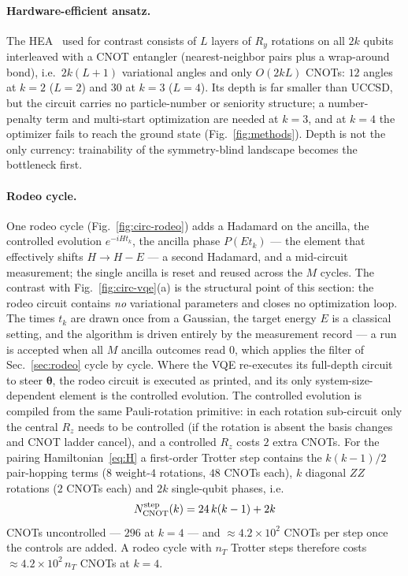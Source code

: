 \documentclass[
  aps,            %
  prc,            %
  reprint,        %
  superscriptaddress,
  floatfix,
  nofootinbib
]{revtex4-2}
\begin{document}
\paragraph{Hardware-efficient ansatz.}
The HEA~\cite{Kandala2017} used for contrast consists of $L$ layers of
$R_y$ rotations on all $2k$ qubits interleaved with a CNOT entangler
(nearest-neighbor pairs plus a wrap-around bond), i.e.\ $2k(L{+}1)$ variational
angles and only $O(2kL)$ CNOTs: $12$ angles at $k=2$ ($L=2$) and $30$ at $k=3$
($L=4$).  Its depth is far smaller than UCCSD, but the circuit carries no
particle-number or seniority structure; a number-penalty term and multi-start
optimization are needed at $k=3$, and at $k=4$ the optimizer fails to reach the
ground state (Fig.~\ref{fig:methods}).  Depth is not the only currency:
trainability of the symmetry-blind landscape becomes the bottleneck first.

\paragraph{Rodeo cycle.}
One rodeo cycle (Fig.~\ref{fig:circ-rodeo}) adds a Hadamard on the ancilla, the
controlled evolution $e^{-iHt_k}$, the ancilla phase $P(Et_k)$ --- the element
that effectively shifts $H\to H-E$ --- a second Hadamard, and a mid-circuit
measurement; the single ancilla is reset and reused across the $M$ cycles.  The
contrast with Fig.~\ref{fig:circ-vqe}(a) is the structural point of this
section: the rodeo circuit contains \emph{no} variational parameters and closes
no optimization loop.  The times $t_k$ are drawn once from a Gaussian, the
target energy $E$ is a classical setting, and the algorithm is driven entirely
by the measurement record --- a run is accepted when all $M$ ancilla outcomes
read $0$, which applies the filter of Sec.~\ref{sec:rodeo} cycle by cycle.
Where the VQE re-executes its full-depth circuit to steer $\boldsymbol\theta$,
the rodeo circuit is executed as printed, and its only system-size-dependent
element is the controlled evolution.  The controlled evolution is
compiled from the same Pauli-rotation primitive: in each rotation sub-circuit
only the central $R_z$ needs to be controlled (if the rotation is absent the
basis changes and CNOT ladder cancel), and a controlled $R_z$ costs $2$ extra
CNOTs.  For the pairing Hamiltonian~\eqref{eq:H} a first-order Trotter step
contains the $k(k{-}1)/2$ pair-hopping terms ($8$ weight-$4$ rotations, $48$
CNOTs each), $k$ diagonal $ZZ$ rotations ($2$ CNOTs each) and $2k$ single-qubit
phases, i.e.
\begin{equation}
  N_{\rm CNOT}^{\rm step}(k)=24\,k(k-1)+2k
  \label{eq:trottercost}
\end{equation}
CNOTs uncontrolled --- $296$ at $k=4$ --- and $\approx 4.2\times10^{2}$ CNOTs per
step once the controls are added.  A rodeo cycle with $n_T$ Trotter steps
therefore costs $\approx 4.2\times10^{2}\,n_T$ CNOTs at $k=4$.
\end{document}
